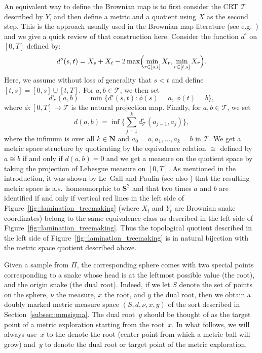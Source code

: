\documentclass[JEP,XML,SOM,Unicode]{cedram}
\let\mathcal\mathscr
\let\oldS\S
\theoremstyle{plain}
\numberwithin{theorem}{section}
\theoremstyle{definition}
\newcommand{\CT}{{\mathcal T}}\let\treespace\CT
\newcommand{\N}{\mathbf{N}}
\renewcommand{\S}{{\mathbf S}}
\let\snakeexcursionmeasure \Pi
\begin{document}
An equivalent way to define the Brownian map is to first consider the CRT $\CT$ described by $Y$, and then define a metric and a quotient using $X$ as the second step. This is the approach usually used in the Brownian map literature (see e.g.\ \cite[\oldS 3.5]{legall2014icm}) and we give a quick review of that construction here. Consider the function $d^\circ$ on $[0,T]$ defined by:
\begin{equation}
\label{eqn::circ_distance_time}
d^\circ(s,t) = X_s + X_t - 2\max\Bigl( \min_{r \in [s,t]} X_r, \min_{r \in [t,s]} X_r \Bigr).
\end{equation}
Here, we assume without loss of generality that $s < t$ and define $[t,s] = [0,s] \cup [t,T]$. For $a,b \in \CT$, we then set
\begin{equation}
\label{eqn::circe_distance_tree}
d_\CT^\circ(a,b) = \min\{ d^\circ(s,t) : \phi(s) = a,\ \phi(t) = b\},
\end{equation}
where $\phi \colon [0,T] \to \CT$ is the natural projection map. Finally, for $a,b \in \CT$, we set
\begin{equation}
\label{eqn::bm_distance_inf}
d(a,b) = \inf\biggl\{ \sum_{j=1}^k d_\CT^\circ(a_{j-1},a_j) \biggr\},
\end{equation}
where the infimum is over all $k \in \N$ and $a_0=a,a_1,\ldots,a_k=b$ in $\CT$. We get a metric space structure by quotienting by the equivalence relation $\cong$ defined by $a \cong b$ if and only if $d(a,b) = 0$ and we get a measure on the quotient space by taking the projection of Lebesgue measure on $[0,T]$.
As mentioned in the introduction, it was shown by Le~Gall and Paulin \cite{le2008scaling} (see also \cite{MR2399286}) that the resulting metric space is a.s.\ homeomorphic to $\S^2$ and that two times $a$ and $b$ are identified if and only if vertical red lines in the left side of Figure~\ref{fig::lamination_treemaking} (where $X_t$ and $Y_t$ are Brownian snake coordinates) belong to the same equivalence class as described in the left side of Figure~\ref{fig::lamination_treemaking}. Thus the topological quotient described in the left side of Figure~\ref{fig::lamination_treemaking} is in natural bijection with the metric space quotient described above.

Given a sample from $\snakeexcursionmeasure$, the corresponding sphere comes with two special points corresponding to a snake whose head is at the leftmost possible value (the root), and the origin snake (the dual root). Indeed, if we let $S$ denote the set of points on the sphere, $\nu$ the measure, $x$ the root, and $y$ the dual root, then we obtain a doubly marked metric measure space $(S,d, \nu,x,y)$ of the sort described in Section~\ref{subsec::mmsigma}. The dual root~$y$ should be thought of as the target point of a metric exploration starting from the root~$x$. In what follows, we will always use~$x$ to the denote the root (center point from which a metric ball will grow) and~$y$ to denote the dual root or target point of the metric exploration.
\end{document}
